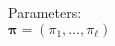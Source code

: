 \documentclass[preview]{standalone}
\begin{document}
\begin{center}
Parameters:\\ $\mathbf{\pi} = (\pi_1, \ldots, \pi_\ell)$
\end{center}
\end{document}
